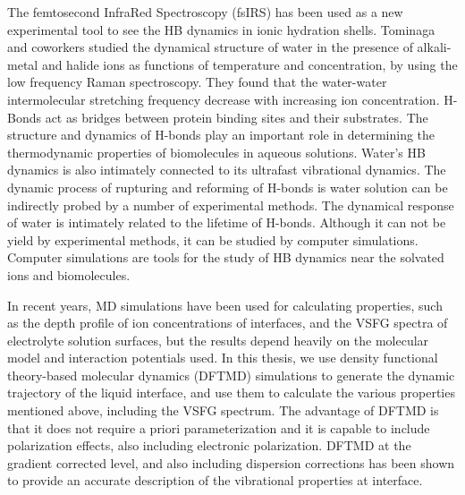 The femtosecond InfraRed Spectroscopy (fsIRS) has been used as a new experimental tool to see the HB dynamics in ionic hydration shells\cite{Laage2007}. 
Tominaga and coworkers studied the dynamical structure of water in the presence of alkali-metal and halide ions as functions of temperature and concentration, 
by using the low frequency Raman spectroscopy. 
They found that the water-water intermolecular stretching frequency decrease with increasing ion concentration\cite{KM98,Amo00}.
H-Bonds act as bridges between protein binding sites and their substrates\cite{Ball05}.
The structure and dynamics of H-bonds play an important role in determining the thermodynamic properties of biomolecules in aqueous solutions\cite{HX01}. 
Water’s HB dynamics is also intimately connected to its ultrafast vibrational dynamics\cite{Nagata15}. 
The dynamic process of rupturing and reforming of H-bonds is water solution can be indirectly probed by a number of experimental methods\cite{OC84,JT85}.
The dynamical response of water is intimately related to the lifetime of H-bonds\cite{SP05}. 
Although it can not be yield by experimental methods, it can be studied by computer simulations\cite{Rapaport1983,Voloshin2009}.
Computer simulations are tools for the study of HB dynamics near the solvated ions and biomolecules\cite{PJR79,YKC98}.


In recent years, MD simulations have been used for calculating properties, 
such as the depth profile of ion concentrations of interfaces\cite{Jungwirth2001,Jungwirth2002}, and the VSFG spectra 
of electrolyte solution surfaces\cite{Gopalakrishnan2006,Johnson2014,Ishiyama2014,Ishiyama2017},
but the results depend heavily on the molecular model and interaction potentials used\cite{LXD03,MKP04,TI07,MM05}.
In this thesis, we use density functional theory-based molecular dynamics (DFTMD) simulations to generate the dynamic trajectory of 
the liquid interface, and use them to calculate the various properties mentioned above, including the VSFG spectrum.  
The advantage of DFTMD is that it does not require a priori parameterization and it is capable to include polarization effects\cite{Ufimtsev2011},
also including electronic polarization. DFTMD at the gradient corrected level, and also including dispersion corrections\cite{Grimme04,Grimme06,Grimme07,Grimme10,Baer2011}
has been shown to provide an accurate description of the vibrational properties at interface\cite{Fornaro2015}.

